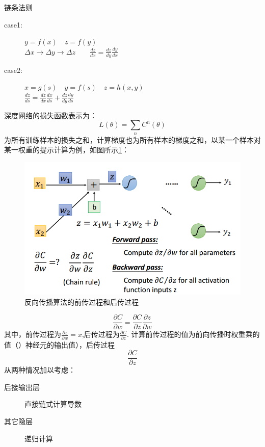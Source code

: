 \begin{myquotation}{链条法则}
\begin{description}
	\item[case1:] $y=f(x) \quad z=f(y)$\\
					$\Delta x \rightarrow \Delta y \rightarrow \Delta z \qquad \frac{dz}{dx}=\frac{dz}{dy} \frac{dy}{dx}$
	\item[case2:] $x=g(s) \quad y=f(s) \quad z=h(x,y)$\\
					$\frac{dz}{ds}=\frac{dz}{dx}\frac{dx}{ds} + \frac{dz}{dy}\frac{dy}{ds}$
\end{description}	
\end{myquotation}
深度网络的损失函数表示为：
\[
L(\theta) = \sum_{ n } C^{n}(\theta)
\]
为所有训练样本的损失之和，计算梯度也为所有样本的梯度之和，以某一个样本对某一权重的提示计算为例，如图所示\ref{fig:backpropagation}：
\begin{figure}[htb]
	\centering
	\includegraphics[scale=0.4]{pic/backpropagation}
	\caption{反向传播算法的前传过程和后传过程}
	\label{fig:backpropagation}
\end{figure}
\[
\frac{\partial C}{\partial w} = \frac{\partial C}{\partial z} \frac{\partial z}{\partial w}
\]
其中，前传过程为$\frac{\partial z}{\partial w}=x$,后传过程为$\frac{\partial C}{\partial z}$.
计算前传过程的值为前向传播时权重乘的值（）神经元的输出值），后传过程$$\frac{\partial C}{\partial z}$$从两种情况加以考虑：

\begin{description}
 \item[后接输出层] 直接链式计算导数
\item[其它隐层] 递归计算
\end{description}

